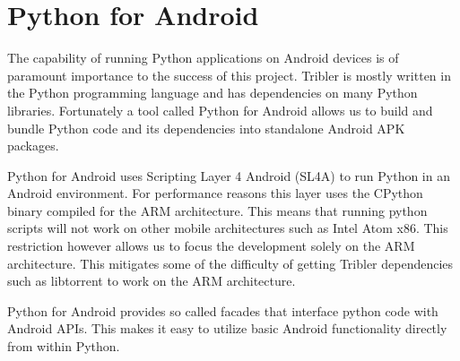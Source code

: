 \section{Python for Android}
	\label{scc:p4a}
	The capability of running Python applications on Android devices is of paramount importance to the success of this project. Tribler is mostly written in the Python programming language and has dependencies on many Python libraries. Fortunately a tool called Python for Android allows us to build and bundle Python code and its dependencies into standalone Android APK packages.

	Python for Android uses Scripting Layer 4 Android (SL4A) to run Python in an Android environment. For performance reasons this layer uses the CPython binary compiled for the ARM architecture. This means that running python scripts will not work on other mobile architectures such as Intel Atom x86. This restriction however allows us to focus the development solely on the ARM architecture. This mitigates some of the difficulty of getting Tribler dependencies such as libtorrent to work on the ARM architecture.

	Python for Android provides so called facades that interface python code with Android APIs. This makes it easy to utilize basic Android functionality directly from within Python.
